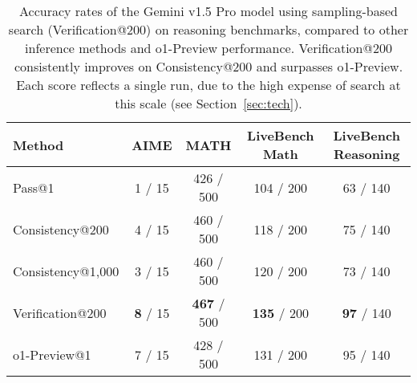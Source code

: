 

\begin{table}[htbp]
\centering
\begin{tabular}{lcccc}
\toprule
\textbf{Method} & \textbf{AIME} & \textbf{MATH} & \textbf{LiveBench Math} & \textbf{LiveBench Reasoning} \\
\midrule
Pass@1 & 1 / 15 & 426 / 500 &  104 / 200 & 63 / 140 \\
Consistency@200 & 4 / 15  & 460 / 500 & 118 / 200  & 75 / 140 \\
Consistency@1,000 & 3 / 15  & 460 / 500 & 120 / 200  & 73 / 140 \\
\rowcolor{subtleyellow} Verification@200 & {\textbf{8}} / 15 & \textbf{467} / 500 & \textbf{135} / 200  & \textbf{97} / 140 \\
o1-Preview@1 & 7 / 15 & 428 / 500 & 131 / 200  & 95 / 140 \\
\bottomrule
\end{tabular}
\caption{Accuracy rates of the Gemini v1.5 Pro model using sampling-based search (Verification@200) on reasoning benchmarks, compared to other inference methods and o1-Preview performance.
Verification@200 consistently improves on Consistency@200 and surpasses o1-Preview.\protect\footnotemark{}
Each score reflects a single run, due to the high expense of search at this scale (see Section~\ref{sec:tech}).
}
\label{tab:main-sota}
\end{table}


